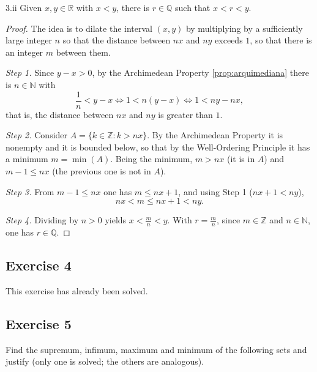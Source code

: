 \documentclass[11pt, a4paper]{article}
\begin{document}
\begin{proposicion}{3.ii}{}
Given $x, y \in \mathbb{R}$ with $x < y$, there is $r \in \mathbb{Q}$ such that $x < r < y$.
\end{proposicion}

\begin{proof}
The idea is to dilate the interval $(x, y)$ by multiplying by a sufficiently large integer $n$ so
that the distance between $nx$ and $ny$ exceeds $1$, so that there is an integer $m$ between them.

\textit{Step 1.} Since $y - x > 0$, by the Archimedean Property \ref{prop:arquimediana} there is
$n \in \mathbb{N}$ with
$$ \frac{1}{n} < y - x \iff 1 < n(y - x) \iff 1 < ny - nx, $$
that is, the distance between $nx$ and $ny$ is greater than $1$.

\textit{Step 2.} Consider $A = \{ k \in \mathbb{Z} : k > nx \}$. By the Archimedean Property it is
nonempty and it is bounded below, so that by the Well-Ordering Principle it has a minimum
$m = \min(A)$. Being the minimum, $m > nx$ (it is in $A$) and $m - 1 \le nx$ (the previous one is not in
$A$).

\textit{Step 3.} From $m - 1 \le nx$ one has $m \le nx + 1$, and using Step 1 ($nx + 1 < ny$),
$$ nx < m \le nx + 1 < ny. $$

\textit{Step 4.} Dividing by $n > 0$ yields $x < \frac{m}{n} < y$. With $r = \frac{m}{n}$, since
$m \in \mathbb{Z}$ and $n \in \mathbb{N}$, one has $r \in \mathbb{Q}$.
\end{proof}

\subsection*{Exercise 4}

This exercise has already been solved.

\subsection*{Exercise 5}

Find the supremum, infimum, maximum and minimum of the following sets and justify (only one is
solved; the others are analogous).
\end{document}
